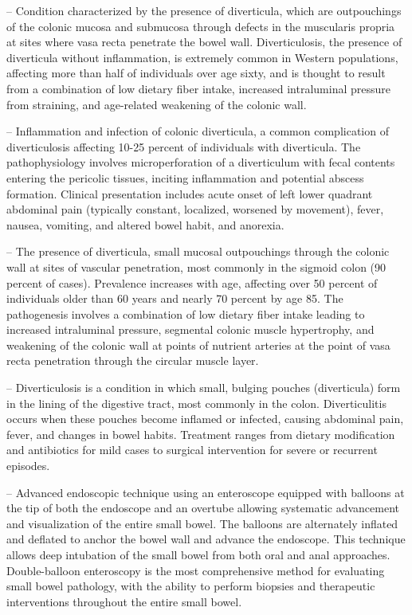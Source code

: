 -- Condition characterized by the presence of diverticula, which are outpouchings of the colonic mucosa and submucosa through defects in the muscularis propria at sites where vasa recta penetrate the bowel wall. Diverticulosis, the presence of diverticula without inflammation, is extremely common in Western populations, affecting more than half of individuals over age sixty, and is thought to result from a combination of low dietary fiber intake, increased intraluminal pressure from straining, and age-related weakening of the colonic wall.

-- Inflammation and infection of colonic diverticula, a common complication of diverticulosis affecting 10-25 percent of individuals with diverticula. The pathophysiology involves microperforation of a diverticulum with fecal contents entering the pericolic tissues, inciting inflammation and potential abscess formation. Clinical presentation includes acute onset of left lower quadrant abdominal pain (typically constant, localized, worsened by movement), fever, nausea, vomiting, and altered bowel habit, and anorexia.

-- The presence of diverticula, small mucosal outpouchings through the colonic wall at sites of vascular penetration, most commonly in the sigmoid colon (90 percent of cases). Prevalence increases with age, affecting over 50 percent of individuals older than 60 years and nearly 70 percent by age 85. The pathogenesis involves a combination of low dietary fiber intake leading to increased intraluminal pressure, segmental colonic muscle hypertrophy, and weakening of the colonic wall at points of nutrient arteries at the point of vasa recta penetration through the circular muscle layer.

-- Diverticulosis is a condition in which small, bulging pouches (diverticula) form in the lining of the digestive tract, most commonly in the colon. Diverticulitis occurs when these pouches become inflamed or infected, causing abdominal pain, fever, and changes in bowel habits. Treatment ranges from dietary modification and antibiotics for mild cases to surgical intervention for severe or recurrent episodes.

-- Advanced endoscopic technique using an enteroscope equipped with balloons at the tip of both the endoscope and an overtube allowing systematic advancement and visualization of the entire small bowel. The balloons are alternately inflated and deflated to anchor the bowel wall and advance the endoscope. This technique allows deep intubation of the small bowel from both oral and anal approaches. Double-balloon enteroscopy is the most comprehensive method for evaluating small bowel pathology, with the ability to perform biopsies and therapeutic interventions throughout the entire small bowel.

